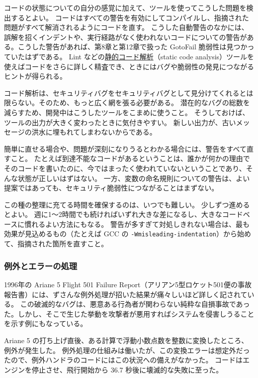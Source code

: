 \documentclass[uplatex]{jsarticle}
\def\label#1{}%
\begin{document}
コードの状態についての自分の感覚に加えて、ツールを使ってこうした問題を検出するとよい。
コードはすべての警告を有効にしてコンパイルし、指摘された問題がすべて解消されるようにコードを直す。
こうした自動警告のなかには、誤解を招くインデントや、実行経路がなく使われないコードについての警告がある。こうした警告があれば、第8章と第12章で扱った GotoFail 脆弱性は見つかっていたはずである。
Lint などの\underline{静的コード解析}（static code analysis）ツールを使えばコードをさらに詳しく精査でき、ときにはバグや脆弱性の発見につながるヒントが得られる。

コード解析は、セキュリティバグをセキュリティバグとして見分けてくれるとは限らない。そのため、もっと広く網を張る必要がある。
潜在的なバグの総数を減らすため、開発中はこうしたツールをこまめに使うこと。
そうしておけば、ツールの出力が大きく変わったときに気付きやすい。
新しい出力が、古いメッセージの洪水に埋もれてしまわないからである。

簡単に直せる場合や、問題が深刻になりうるとわかる場合には、警告をすべて直すこと。
たとえば到達不能なコードがあるということは、誰かが何かの理由でそのコードを書いたのに、今ではまったく使われていないということであり、そんな状態が正しいはずはない。
一方、変数の命名規則についての警告は、よい提案ではあっても、セキュリティ脆弱性につながることはまずない。

この種の整理に充てる時間を確保するのは、いつでも難しい。
少しずつ進めるとよい。
週に1〜2時間でも続ければいずれ大きな差になるし、大きなコードベースに慣れるよい方法にもなる。
警告が多すぎて対処しきれない場合は、最も効果が見込めるもの（たとえば GCC の \texttt{-Wmisleading-indentation}）から始めて、指摘された箇所を直すこと。

\subsubsection{例外とエラーの処理}

1996年の Ariane 5 Flight 501 Failure Report（アリアン5型ロケット501便の事故報告書）には、ずさんな例外処理が招いた結果が痛々しいほど詳しく記されている。
この破滅的なバグは、悪意ある行為者が関わらない純粋な自損事故であった。しかし、そこで生じた挙動を攻撃者が悪用すればシステムを侵害しうることを示す例にもなっている。

\begin{exa}\label{exa:ch13-ariane5}
Ariane 5 の打ち上げ直後、ある計算で浮動小数点数を整数に変換したところ、例外が発生した。
例外処理の仕組みは働いたが、この変換エラーは想定外だったので、例外ハンドラのコードにはこの状況への備えがなかった。
コードはエンジンを停止させ、飛行開始から 36.7 秒後に壊滅的な失敗に至った。
\end{exa}
\end{document}
